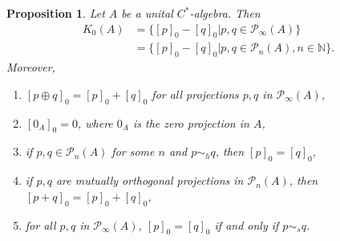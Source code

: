 \documentclass{book}
\newtheorem{proposition}[definition]{Proposition}
\def\cstar{\(C^*\)-algebra}
\begin{document}
\begin{proposition}\label{prop:617}
  Let \(A\) be a unital \cstar. Then
  \begin{align}\label{eq:32}
      K_0(A)&=\{{[p]}_0-{[q]}_0| p,q\in\mathcal{P}_\infty(A)\}\\
      &=\{{[p]}_0-{[q]}_0| p,q\in\mathcal{P}_n(A), n\in\mathbb{N}\}.
  \end{align}
  Moreover,
  \begin{enumerate}
    \item \({[p\oplus q]}_0={[p]}_0+{[q]}_0\) for all projections \(p, q\) in \(\mathcal{P}_\infty(A)\),
    \item \({[0_A]}_0=0\), where \(0_A\) is the zero projection in \(A\),
    \item if \(p, q\in\mathcal{P}_n(A)\) for some \(n\) and \(p\sim_h q\), then \({[p]}_0={[q]}_0\),
    \item if \(p, q\) are mutually orthogonal projections in \(\mathcal{P}_n(A)\), then \({[p+q]}_0={[p]}_0+{[q]}_0\),
    \item for all \(p, q\) in \(\mathcal{P}_\infty(A)\), \({[p]}_0={[q]}_0\) if and only if \(p\sim_s q\).
  \end{enumerate}
\end{proposition}
\end{document}
